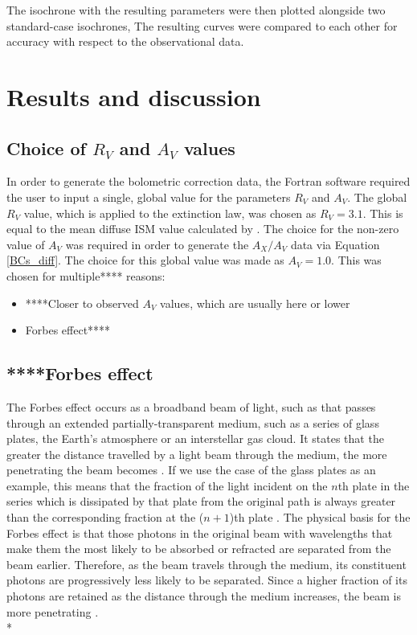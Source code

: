 \documentclass[12pt, a4paper]{report}
\begin{document}
The isochrone with the resulting parameters were then plotted alongside two standard-case isochrones, The resulting curves were compared to each other for accuracy with respect to the observational data.


\chapter{Results and discussion}
\section{Choice of $R_{V}$ and $A_{V}$ values}
In order to generate the bolometric correction data, the Fortran software required the user to input a single, global value for the parameters $R_{V}$ and $A_{V}$. The global $R_{V}$ value, which is applied to the \cite{1989ApJ...345..245C} extinction law, was chosen as $R_{V} = 3.1$. This is equal to the mean diffuse ISM value calculated by \cite{1985ApJ...288..618R}. The choice for the non-zero value of $A_{V}$ was required in order to generate the $A_{X}/A_{V}$ data via Equation \ref{BCs_diff}. The choice for this global value was made as $A_{V} = 1.0$. This was chosen for multiple**** reasons:

\begin{itemize}
\item ****Closer to observed $A_{V}$ values, which are usually here or lower
\item Forbes effect****
\end{itemize}

\section{****Forbes effect}
The Forbes effect occurs as a broadband beam of light, such as that passes through an extended partially-transparent medium, such as a series of glass plates, the Earth's atmosphere or an interstellar gas cloud. It states that the greater the distance travelled by a light beam through the medium, the more penetrating the beam becomes \citep{1842RSPT..132..225F}. If we use the case of the glass plates as an example, this means that the fraction of the light incident on the $n$th plate in the series which is dissipated by that plate from the original path is always greater than the corresponding fraction at the ($n+1$)th plate \citep{1995A&AS..109..293G}. The physical basis for the Forbes effect is that those photons in the original beam with wavelengths that make them the most likely to be absorbed or refracted are separated from the beam earlier. Therefore, as the beam travels through the medium, its constituent photons are progressively less likely to be separated. Since a higher fraction of its photons are retained as the distance through the medium increases, the beam is more penetrating \citep{OHVRIL1999305}.\\*
\end{document}
